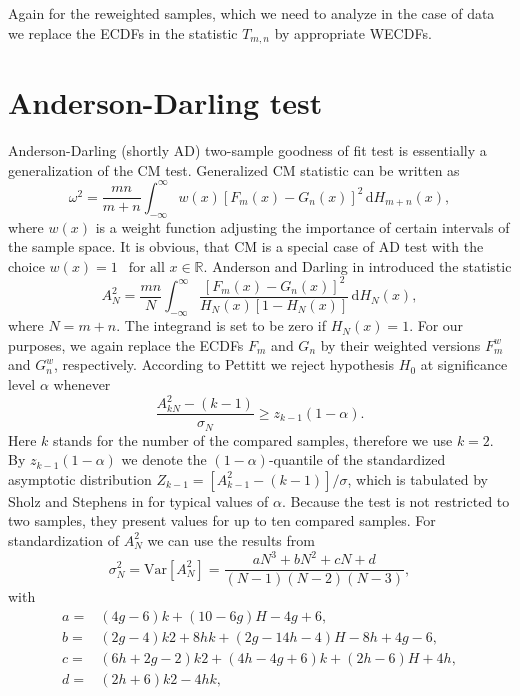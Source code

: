 Again for the reweighted samples, which we need to analyze in the case of \dzero data we replace the ECDFs in the statistic $T_{m,n}$ by appropriate WECDFs.

\section{Anderson-Darling test}
Anderson-Darling (shortly AD) two-sample goodness of fit test is essentially a generalization of the CM test. Generalized CM statistic can be written as 
\begin{equation}
\omega^2 = \frac{mn}{m+n} \int_{-\infty}^\infty w(x) \left[F_m(x) - G_n(x) \right]^2 \,\mathrm{d} H_{m+n}(x),
\end{equation}
where $w(x)$ is a weight function adjusting the importance of certain intervals of the sample space. It is obvious, that CM is a special case of AD test with the choice $w(x) = 1 \:\: \text{ for all } x \in \mathbb{R}.$ Anderson and Darling   in \cite{AndersonDarling1954} introduced the statistic 
\begin{equation}
A^2_{N} = \frac{mn}{N} \int_{-\infty}^\infty \frac{\left[F_m(x) - G_n(x) \right]^2}{H_{N}(x)\left[ 1 - H_{N}(x)\right]} \,\mathrm{d} H_{N}(x),
\end{equation}
where $N = m+n$. The integrand is set to be zero if $H_{N}(x) = 1$. For our purposes, we again replace the ECDFs $F_m$ and $G_n$ by their weighted versions $F_m^w$ and $G_n^w$, respectively.
According to Pettitt \cite{Pettitt1976} we reject hypothesis $H_0$ at significance level $\alpha$ whenever
\begin{equation}
\frac{A^2_{kN} - (k-1)}{\sigma_{N}} \geq z_{k-1}(1-\alpha).
\end{equation}
Here $k$ stands for the number of the compared samples, therefore we use $k=2$. By $z_{k-1}(1-\alpha)$ we denote the $(1-\alpha)$-quantile of the standardized asymptotic distribution $Z_{k-1} = [A^2_{k-1} - (k-1)]/{\sigma}$, which is tabulated by Sholz and Stephens in \cite{Sholz1986} for typical values of $\alpha$.  Because the test is not restricted to two samples, they present values for up to ten compared samples.
For standardization of $A^2_{N}$ we can use the results from \cite{Sholz1986} 
\begin{equation}
\sigma_{N}^2 = \mathrm{Var}\left[ A^2_{N}\right] = \frac{ aN^3 + bN^2 + cN + d
 }{(N-1)(N-2)(N-3)},
\end{equation}
with 
\begin{align*}
a = & (4g - 6)k + (10 - 6g)H - 4g + 6, \\
b = &(2g - 4)k 2 + 8hk + (2g - 14h - 4)H - 8h + 4g - 6, \\
c = &(6h + 2g - 2)k2 + (4h - 4g + 6)k + (2h - 6)H + 4h,  \\
d = &(2h + 6)k 2 - 4hk, 
\end{align*}
